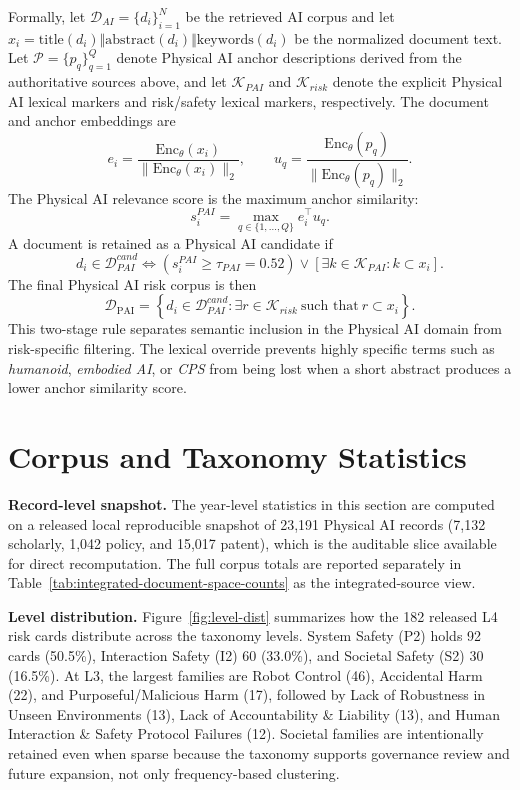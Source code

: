 \documentclass[11pt]{article}
\newcommand{\DPAI}{\mathcal{D}_{\mathrm{PAI}}}
\newcommand{\Enc}{\mathrm{Enc}_{\theta}}
\begin{document}
Formally, let \(\mathcal{D}_{AI}=\{d_i\}_{i=1}^{N}\) be the retrieved AI corpus and let \(x_i=\mathrm{title}(d_i)\Vert\mathrm{abstract}(d_i)\Vert\mathrm{keywords}(d_i)\) be the normalized document text. Let \(\mathcal{P}=\{p_q\}_{q=1}^{Q}\) denote Physical AI anchor descriptions derived from the authoritative sources above, and let \(\mathcal{K}_{PAI}\) and \(\mathcal{K}_{risk}\) denote the explicit Physical AI lexical markers and risk/safety lexical markers, respectively. The document and anchor embeddings are
\begin{equation}
  e_i=\frac{\Enc(x_i)}{\|\Enc(x_i)\|_2}, \qquad
  u_q=\frac{\Enc(p_q)}{\|\Enc(p_q)\|_2}.
\end{equation}
The Physical AI relevance score is the maximum anchor similarity:
\begin{equation}
  s_i^{PAI}=\max_{q\in\{1,\ldots,Q\}} e_i^{\top}u_q.
\end{equation}
A document is retained as a Physical AI candidate if
\begin{equation}
  d_i\in\mathcal{D}_{PAI}^{cand}
  \Longleftrightarrow
  \left(s_i^{PAI}\geq\tau_{PAI}=0.52\right)
  \lor
  \left[\exists k\in\mathcal{K}_{PAI}: k\subset x_i\right].
\end{equation}
The final Physical AI risk corpus is then
\begin{equation}
  \DPAI=
  \left\{d_i\in\mathcal{D}_{PAI}^{cand}:
  \exists r\in\mathcal{K}_{risk}\ \text{such that}\ r\subset x_i
  \right\}.
\end{equation}
This two-stage rule separates semantic inclusion in the Physical AI domain from risk-specific filtering. The lexical override prevents highly specific terms such as \textit{humanoid}, \textit{embodied AI}, or \textit{CPS} from being lost when a short abstract produces a lower anchor similarity score.

\section{Corpus and Taxonomy Statistics}

\textbf{Record-level snapshot.} The year-level statistics in this section are computed on a released local reproducible snapshot of 23,191 Physical AI records (7,132 scholarly, 1,042 policy, and 15,017 patent), which is the auditable slice available for direct recomputation. The full corpus totals are reported separately in Table~\ref{tab:integrated-document-space-counts} as the integrated-source view.

\textbf{Level distribution.} Figure~\ref{fig:level-dist} summarizes how the 182 released L4 risk cards distribute across the taxonomy levels. System Safety (P2) holds 92 cards (50.5\%), Interaction Safety (I2) 60 (33.0\%), and Societal Safety (S2) 30 (16.5\%). At L3, the largest families are Robot Control (46), Accidental Harm (22), and Purposeful/Malicious Harm (17), followed by Lack of Robustness in Unseen Environments (13), Lack of Accountability \& Liability (13), and Human Interaction \& Safety Protocol Failures (12). Societal families are intentionally retained even when sparse because the taxonomy supports governance review and future expansion, not only frequency-based clustering.
\end{document}
